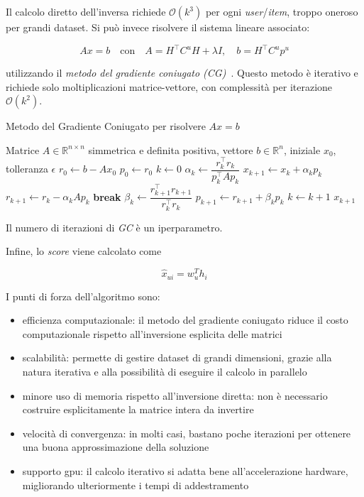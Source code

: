 Il calcolo diretto dell'inversa richiede $\mathcal{O}(k^3)$ per ogni \textit{user}/\textit{item}, troppo oneroso per grandi dataset. Si può invece risolvere il sistema lineare associato:

\[
A x = b \quad \text{con} \quad A = H^\top C^u H + \lambda I, \quad b = H^\top C^u p^u
\]

utilizzando il \textit{metodo del gradiente coniugato (CG)}~\cite{ALS_opt}. Questo metodo è iterativo e richiede solo moltiplicazioni matrice-vettore, con complessità per iterazione $\mathcal{O}(k^2)$.

\begin{algorithm}[H]
    \caption{Metodo del Gradiente Coniugato per risolvere $Ax = b$}
    \begin{algorithmic}[1]
    \Require Matrice $A \in \mathbb{R}^{n \times n}$ simmetrica e definita positiva, vettore $b \in \mathbb{R}^n$, iniziale $x_0$, tolleranza $\epsilon$
    \State $r_0 \gets b - A x_0$
    \State $p_0 \gets r_0$
    \State $k \gets 0$
        \State $\alpha_k \gets \dfrac{r_k^\top r_k}{p_k^\top A p_k}$
        \State $x_{k+1} \gets x_k + \alpha_k p_k$
        \State $r_{k+1} \gets r_k - \alpha_k A p_k$
            \State \textbf{break}
        \EndIf
        \State $\beta_k \gets \dfrac{r_{k+1}^\top r_{k+1}}{r_k^\top r_k}$
        \State $p_{k+1} \gets r_{k+1} + \beta_k p_k$
        \State $k \gets k + 1$
    \EndWhile
    \State \Return $x_{k+1}$
    \end{algorithmic}
\end{algorithm}
    
Il numero di iterazioni di \textit{GC} è un iperparametro.

Infine, lo \textit{score} viene calcolato come

\[
\hat{x}_{ui} = w_u^T h_i
\]

I punti di forza dell'algoritmo sono:
\begin{itemize}
    \item efficienza computazionale: il metodo del gradiente coniugato riduce il costo computazionale rispetto all'inversione esplicita delle matrici
    \item scalabilità: permette di gestire dataset di grandi dimensioni, grazie alla natura iterativa e alla possibilità di eseguire il calcolo in parallelo
    \item minore uso di memoria rispetto all'inversione diretta: non è necessario costruire esplicitamente la matrice intera da invertire
    \item velocità di convergenza: in molti casi, bastano poche iterazioni per ottenere una buona approssimazione della soluzione
    \item supporto gpu: il calcolo iterativo si adatta bene all'accelerazione hardware, migliorando ulteriormente i tempi di addestramento
\end{itemize}

